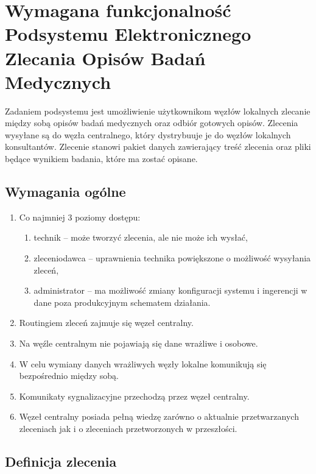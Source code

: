\documentclass[a4paper]{report}
\begin{document}
\chapter[Podsystem Elektronicznego Zlecania Opisów Badań]{Wymagana funkcjonalność Podsystemu Elektronicznego Zlecania Opisów Badań Medycznych}

Zadaniem podsystemu jest umożliwienie użytkownikom węzłów lokalnych zlecanie między sobą opisów
badań medycznych oraz odbiór gotowych opisów. Zlecenia wysyłane są do węzła centralnego, który
dystrybuuje je do węzłów lokalnych konsultantów. Zlecenie stanowi pakiet danych zawierający
treść zlecenia oraz pliki będące wynikiem badania, które ma zostać opisane. 

\section{Wymagania ogólne}
\begin{enumerate}
\item Co najmniej 3 poziomy dostępu:
        \begin{enumerate}
        \item technik -- może tworzyć zlecenia, ale nie może ich wysłać,
        \item zleceniodawca -- uprawnienia technika powiększone o możliwość wysyłania zleceń,
        \item administrator -- ma możliwość zmiany konfiguracji systemu i ingerencji w dane poza produkcyjnym schematem działania.
        \end{enumerate}
\item Routingiem zleceń zajmuje się węzeł centralny.
\item Na węźle centralnym nie pojawiają się dane wrażliwe i osobowe.
\item W celu wymiany danych wrażliwych węzły lokalne komunikują się bezpośrednio między sobą.
\item Komunikaty sygnalizacyjne przechodzą przez węzeł centralny.
\item Węzeł centralny posiada pełną wiedzę zarówno o aktualnie przetwarzanych zleceniach jak i o zleceniach przetworzonych w przeszłości.
\end{enumerate}

\section{Definicja zlecenia}
\end{document}
